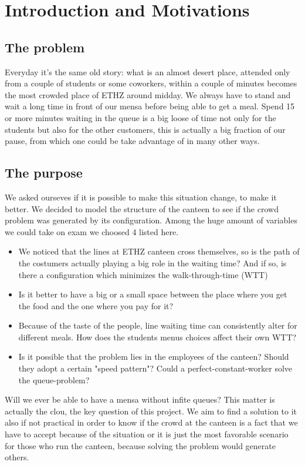 \documentclass[11pt]{article}
\begin{document}
\newpage

\section{Introduction and Motivations}

\subsection{The problem}

Everyday it's the same old story: what is an almost desert place, attended only from a couple of students or some coworkers, within a couple of minutes becomes the most crowded place of ETHZ around midday. We always have to stand and wait a long time in front of our mensa before being able to get a meal. Spend 15 or more minutes waiting in the queue is a big loose of time not only for the students but also for the other customers, this is actually a big fraction of our pause, from which one could be take advantage of in many other ways.

\subsection{The purpose}

We asked ourseves if it is possible to make this situation change, to make it better. We decided to model the structure of the canteen to see if the crowd problem was generated by its configuration. Among the huge amount of variables we could take on exam we choosed 4 listed here. 
\begin{itemize}
    \item We noticed that the lines at ETHZ canteen cross themselves, so is the path of the costumers actually playing a big role in the waiting time? And if so, is there a configuration which minimizes the walk-through-time (WTT)
    \item Is it better to have a big or a small space between the place where you get the food and the one where you pay for it?
    \item Because of the taste of the people, line waiting time can consistently alter for different meals. How does the students menus choices affect their own WTT?
    \item Is it possible that the problem lies in the employees of the canteen? Should they adopt a certain "speed pattern"? Could a perfect-constant-worker solve the queue-problem?
\end{itemize}
Will we ever be able to have a mensa without infite queues? This matter is actually the clou, the key question of this project. We aim to find a solution to it also if not practical in order to know if the crowd at the canteen is a fact that we have to accept because of the situation or it is just the most favorable scenario for those who run the canteen, because solving the problem would generate others.
\end{document}
